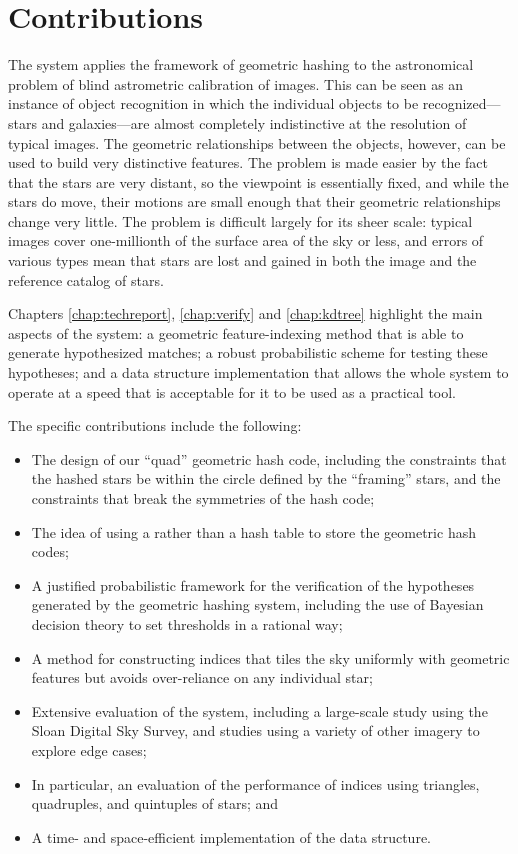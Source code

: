 

\section{Contributions}

The \an system applies the framework of geometric hashing to the
astronomical problem of blind astrometric calibration of images.  This
can be seen as an instance of object recognition in which the
individual objects to be recognized---stars and galaxies---are almost
completely indistinctive at the resolution of typical images.  The
geometric relationships between the objects, however, can be used to
build very distinctive features.  The problem is made easier by the
fact that the stars are very distant, so the viewpoint is essentially
fixed, and while the stars do move, their motions are small enough
that their geometric relationships change very little.  The problem is
difficult largely for its sheer scale: typical images cover
one-millionth of the surface area of the sky or less, and errors of
various types mean that stars are lost and gained in both the image
and the reference catalog of stars.


Chapters \ref{chap:techreport}, \ref{chap:verify} and
\ref{chap:kdtree} highlight the main aspects of the system: a
geometric feature-indexing method that is able to generate
hypothesized matches; a robust probabilistic scheme for testing these
hypotheses; and a data structure implementation that allows the whole
system to operate at a speed that is acceptable for it to be used as a
practical tool.


The specific contributions include the following:
\nonumberparagraphs
\begin{itemize}
\item The design of our
``quad'' geometric hash code, including the constraints that the
hashed stars be within the circle defined by the ``framing'' stars,
and the constraints that break the symmetries of the hash code;
\item The idea of using a \kdtree rather than a hash table to
store the geometric hash codes;
\item A justified probabilistic framework for the verification of
the hypotheses generated by the geometric hashing system, including
the use of Bayesian decision theory to set thresholds in a rational
way;
\item A method for constructing indices that tiles the sky uniformly
with geometric features but avoids over-reliance on any individual
star;
\item Extensive evaluation of the \an system, including a large-scale study using
the Sloan Digital Sky Survey, and studies using a variety of other
imagery to explore edge cases;
\item In particular, an evaluation of the performance of indices using
triangles, quadruples, and quintuples of stars; and
\item A time- and space-efficient implementation of the \kdtree data structure.
\end{itemize}
\numberparagraphs


